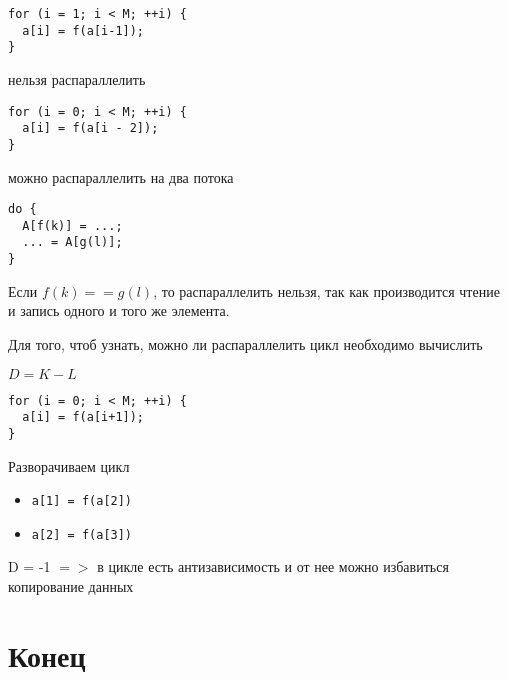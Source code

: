 \begin{frame}[fragile]

\begin{lstlisting}
for (i = 1; i < M; ++i) {
  a[i] = f(a[i-1]);
}
\end{lstlisting}

нельзя распараллелить

\end{frame}

\begin{frame}[fragile]

\begin{lstlisting}
for (i = 0; i < M; ++i) {
  a[i] = f(a[i - 2]);
}
\end{lstlisting}

можно распараллелить на два потока

\end{frame}

\begin{frame}[fragile]

\begin{lstlisting}
do {
  A[f(k)] = ...;
  ... = A[g(l)];
}
\end{lstlisting}

Если $f(k) == g(l)$, то распараллелить нельзя, так как производится чтение и запись одного и того же элемента.

\end{frame}

\begin{frame}[fragile]

Для того, чтоб узнать, можно ли распараллелить цикл необходимо вычислить

$D = K - L$

\begin{lstlisting}
for (i = 0; i < M; ++i) {
  a[i] = f(a[i+1]);
}
\end{lstlisting}

Разворачиваем цикл

\begin{itemize}
  \item \texttt{a[1] = f(a[2])}
  \item \texttt{a[2] = f(a[3])}
\end{itemize}

D = -1 $=>$ в цикле есть антизависимость и от нее можно избавиться копирование данных

\end{frame}

\section*{Конец}


